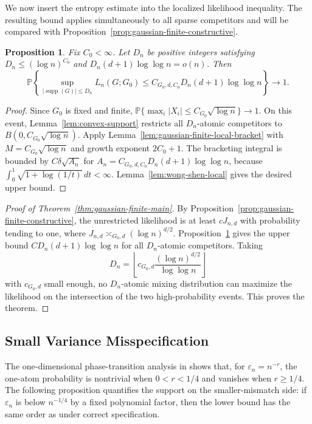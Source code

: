 \documentclass[11pt]{article}
\newtheorem{proposition}[theorem]{Proposition}
\theoremstyle{definition}
\numberwithin{equation}{section}
\newcommand{\eps}{\varepsilon}
\DeclareMathOperator{\supp}{supp}
\begin{document}
We now insert the entropy estimate into the localized likelihood inequality.
The resulting bound applies simultaneously to all sparse competitors and
will be compared with Proposition~\ref{prop:gaussian-finite-constructive}.

\begin{proposition}
\label{prop:gaussian-finite-upper}
Fix \(C_0<\infty\). Let \(D_n\) be positive integers satisfying
\(D_n\le(\log n)^{C_0}\) and
\(D_n(d+1)\log\log n=o(n)\). Then
\[
    \mathbb P\left\{
    \sup_{|\supp(G)|\le D_n}L_n(G;G_0)
    \le C_{G_0,d,C_0}D_n(d+1)\log\log n
    \right\}\to1.
\]
\end{proposition}

\begin{proof}
Since \(G_0\) is fixed and finite, \(\mathbb P\{\max_i|X_i|\le C_{G_0}\sqrt{\log n}\}\to1\). On this event, Lemma~\ref{lem:convex-support} restricts all \(D_n\)-atomic competitors to \(B(0,C_{G_0}\sqrt{\log n})\). Apply Lemma~\ref{lem:gaussian-finite-local-bracket} with \(M=C_{G_0}\sqrt{\log n}\) and growth exponent \(2C_0+1\). The bracketing integral is bounded by \(C\delta\sqrt{A_n}\) for \(A_n=C_{G_0,d,C_0}D_n(d+1)\log\log n\), because \(\int_0^1\sqrt{1+\log(1/t)}\,dt<\infty\). Lemma~\ref{lem:wong-shen-local} gives the desired upper bound.
\end{proof}

\begin{proof}[Proof of Theorem~\ref{thm:gaussian-finite-main}]
By Proposition~\ref{prop:gaussian-finite-constructive}, the unrestricted likelihood is at least \(cJ_{n,d}\) with probability tending to one, where \(J_{n,d}\asymp_{G_0,d}(\log n)^{d/2}\). Proposition~\ref{prop:gaussian-finite-upper} gives the upper bound \(C D_n(d+1)\log\log n\) for all \(D_n\)-atomic competitors. Taking
\[
    D_n=
    \left\lfloor
        c_{G_0,d}\frac{(\log n)^{d/2}}{\log\log n}
    \right\rfloor
\]
with \(c_{G_0,d}\) small enough, no \(D_n\)-atomic mixing distribution can
maximize the likelihood on the intersection of the two high-probability
events. This proves the theorem.
\end{proof}

\subsection{Small Variance Misspecification}
\label{sec:gaussian-small-variance-mismatch}

The one-dimensional phase-transition analysis in
\cite{varianceD1Companion}
shows that, for \(\eps_n=n^{-r}\), the one-atom probability is nontrivial
when \(0<r<1/4\) and vanishes when \(r\ge1/4\). The following proposition
quantifies the support on the smaller-mismatch side: if \(\eps_n\) is below
\(n^{-1/4}\) by a fixed polynomial factor, then the lower bound has the same
order as under correct specification.
\end{document}
